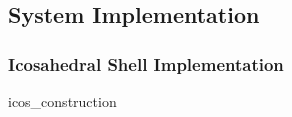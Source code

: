 \subsection{System Implementation}

\subsubsection{Icosahedral Shell Implementation}
icos_construction